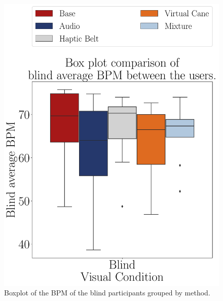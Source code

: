 \begin{figure}[!htb]
    \centering
    \begin{minipage}{0.45\textwidth}
        \centering
        \includegraphics[width = \textwidth]{Resultados/ECG/Figuras/pdf/boxplot_ecg_bpm_blind_scene.pdf}
        \caption{Boxplot of the BPM of the blind participants grouped by method.}
        \label{fig:boxplot_ecg_bpm_blind_scene}
    \end{minipage}
    \begin{minipage}{0.075\textwidth}
        \hfill
    \end{minipage}
    \begin{minipage}{0.45\textwidth}
        \centering

\end{minipage}
\end{figure}
